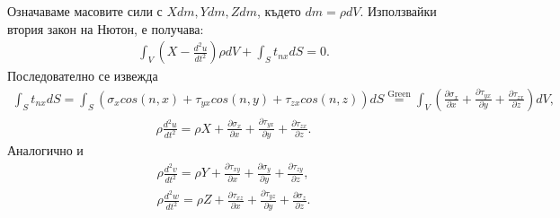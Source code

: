 \documentclass{report}
\begin{document}
	Означаваме масовите сили с $Xdm,Ydm,Zdm$, където $dm=\rho dV$. Използвайки втория закон на Нютон, е получава:
	\begin{align*}
		\int_V(X-\frac{d^2u}{dt^2})\rho dV+\int_St_{nx}dS=0.
	\end{align*}
	Последователно се извежда
	\begin{align*}
		\int_St_{nx}dS=\int_S(\sigma_xcos(n,x)+\tau_{yx}cos(n,y)+\tau_{zx}cos(n,z))dS\overset{\text{Green}}{=}\int_V(\frac{\partial \sigma_x}{\partial x}+\frac{\partial \tau_{yx}}{\partial y}+\frac{\partial \tau_{zx}}{\partial z})dV,
	\end{align*}
	\begin{align}
		\rho \frac{d^2u}{dt^2} = \rho X + \frac{\partial \sigma_x}{\partial x}+\frac{\partial \tau_{yx}}{\partial y}+\frac{\partial \tau_{zx}}{\partial z}.\label{eq:stress2}
	\end{align}
	Аналогично и
	\begin{align}
		\rho \frac{d^2v}{dt^2} = \rho Y + \frac{\partial \tau_{xy}}{\partial x} + \frac{\partial \sigma_y}{\partial y}+\frac{\partial \tau_{zy}}{\partial z} \label{eq:stress3},
		\\
		\rho \frac{d^2w}{dt^2} = \rho Z + \frac{\partial \tau_{xz}}{\partial x} + \frac{\partial \tau_{yz}}{\partial y}+\frac{\partial \sigma_z}{\partial z}. \label{eq:stress4}
	\end{align}
	
\end{document}
